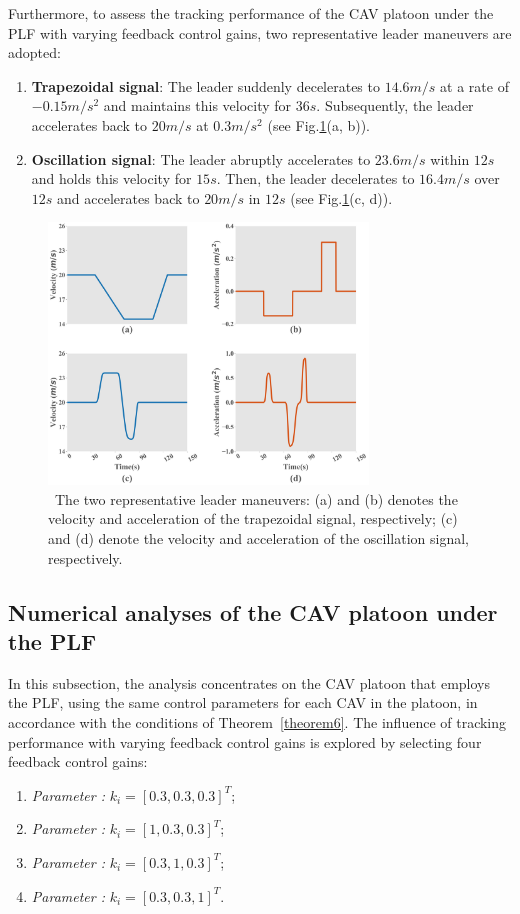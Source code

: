 \documentclass[journal]{IEEEtran}
\begin{document}
Furthermore, to assess the tracking performance of the CAV platoon under the PLF with varying feedback control gains, two representative leader maneuvers are adopted:
\begin{enumerate}
\item \textbf{Trapezoidal signal}: The leader suddenly decelerates to $14.6m/s$ at a rate of $ - 0.15m/{s^2}$ and maintains this velocity for $36s$. Subsequently, the leader accelerates back to $20m/s$ at $ 0.3m/{s^2}$ (see Fig.\ref{fig3}(a, b)).
\item \textbf{Oscillation signal}: The leader abruptly accelerates to $23.6m/s$ within $12s$ and holds this velocity for $15s$. Then, the leader decelerates to $16.4m/s$ over $12s$ and accelerates back to $20m/s$ in $12s$ (see Fig.\ref{fig3}(c, d)).
\end{enumerate}


\begin{figure}

  \centering
  \includegraphics[width=8.5cm]{figs/fig3.png}
  \caption{~The two representative leader maneuvers: (a) and (b) denotes the velocity and acceleration of the trapezoidal signal, respectively; (c) and (d) denote the velocity and acceleration of the oscillation signal, respectively.}
  \label{fig3}

\end{figure}


\subsection{Numerical analyses of the CAV platoon under the PLF}
\label{Section 5.2}
In this subsection, the analysis concentrates on the CAV platoon that employs the PLF, using the same control parameters for each CAV in the platoon, in accordance with the conditions of Theorem~\ref{theorem6}. The influence of tracking performance with varying feedback control gains is explored by selecting four feedback control gains:
\begin{enumerate}
\item \textit{Parameter \uppercase\expandafter{}:} $ {k_i} = {[0.3,0.3,0.3]^T} $;
\item \textit{Parameter \uppercase\expandafter{}:} $ {k_i} = {[1,0.3,0.3]^T} $;
\item \textit{Parameter \uppercase\expandafter{}:} $ {k_i} = {[0.3,1,0.3]^T} $;
\item \textit{Parameter \uppercase\expandafter{}:} $ {k_i} = {[0.3,0.3,1]^T} $.
\end{enumerate}
\end{document}
